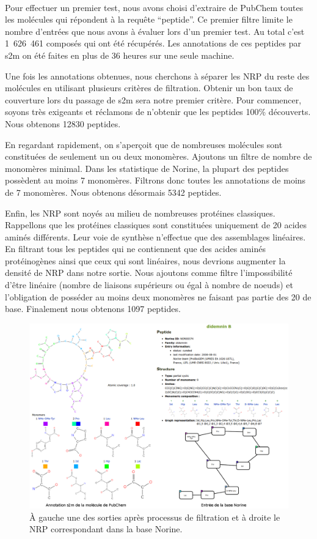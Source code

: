 \documentclass[12pt,french,twoside]{report}
\begin{document}
\paragraph{}Pour effectuer un premier test, nous avons choisi d'extraire de PubChem toutes les molécules qui répondent à la requête ``peptide''.
Ce premier filtre limite le nombre d'entrées que nous avons à évaluer lors d'un premier test.
Au total c'est 1~626~461 composés qui ont été récupérés.
Les annotations de ces peptides par s2m on été faites en plus de 36 heures sur une seule machine.

Une fois les annotations obtenues, nous cherchons à séparer les NRP du reste des molécules en utilisant plusieurs critères de filtration.
Obtenir un bon taux de couverture lors du passage de s2m sera notre premier critère.
Pour commencer, soyons très exigeants et réclamons de n'obtenir que les peptides 100\% découverts.
Nous obtenons 12830 peptides.

En regardant rapidement, on s'aperçoit que de nombreuses molécules sont constituées de seulement un ou deux monomères.
Ajoutons un filtre de nombre de monomères minimal.
Dans les statistique de Norine, la plupart des peptides possèdent au moins 7 monomères.
Filtrons donc toutes les annotations de moins de 7 monomères.
Nous obtenons désormais 5342 peptides.

Enfin, les NRP sont noyés au milieu de nombreuses protéines classiques.
Rappellons que les protéines classiques sont constituées uniquement de 20 acides aminés différents.
Leur voie de synthèse n'effectue que des assemblages linéaires.
En filtrant tous les peptides qui ne contiennent que des acides aminés protéinogènes ainsi que ceux qui sont linéaires, nous devrions augmenter la densité de NRP dans notre sortie.
Nous ajoutons comme filtre l'impossibilité d'être linéaire (nombre de liaisons supérieurs ou égal à nombre de noeuds) et l'obligation de posséder au moins deux monomères ne faisant pas partie des 20 de base.
Finalement nous obtenons 1097 peptides.

\begin{figure}[h!]
  \begin{center}
    \includegraphics[width=450px]{Figures/contributions/didemnin_B.png}
    \caption{\label{didemin}À gauche une des sorties après processus de filtration et à droite le NRP correspondant dans la base Norine.}
  \end{center}
\end{figure}
\end{document}
